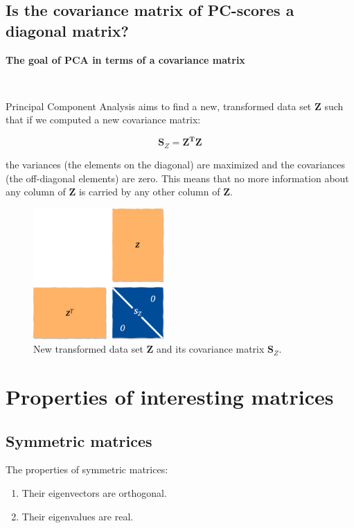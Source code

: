 \documentclass[10pt,twocolumn]{article}
\begin{document}
\subsection{Is the covariance matrix of PC-scores a diagonal matrix?}

\textbf{The goal of PCA in terms of a covariance matrix}

\,\,
\,\,

Principal Component Analysis aims to find a new, transformed data set $\bm{Z}$ such that if we computed a new covariance matrix:

\begin{equation}
\bm{S}_Z =  \bm{Z^T} \bm{Z}
\end{equation}

the variances (the elements on the diagonal) are maximized and the covariances (the off-diagonal elements) are zero. This means that no more information about any column of $\bm{Z}$ is carried by any other column of $\bm{Z}$.

\begin{figure}[H]
\centering\includegraphics[width=5cm]{PC-scores.png}
\caption{New transformed data set $\bm{Z}$ and its covariance matrix $\bm{S}_Z$.}
\label{fig:PC-scores}
\end{figure}






\appendix

\section{Properties of interesting matrices}

\subsection{Symmetric matrices} \label{app:A}

The properties of symmetric matrices:

\begin{enumerate}
\item Their eigenvectors are orthogonal.
\item Their eigenvalues are real.
\end{enumerate}
\end{document}
